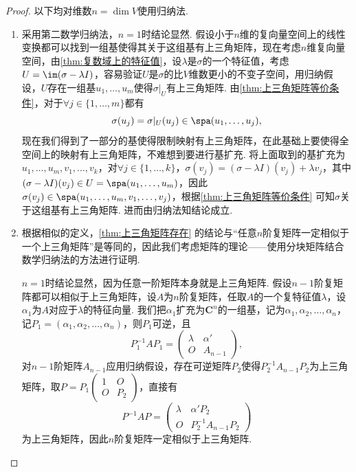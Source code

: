 \begin{proof}
    以下均对维数$n=\dim V$使用归纳法.
    \begin{enumerate}
        \item[法一:] 采用第二数学归纳法，$n=1$时结论显然. 假设小于$n$维的复向量空间上的线性变换都可以找到一组基使得其关于这组基有上三角矩阵，现在考虑$n$维复向量空间，由\autoref{thm:复数域上的特征值}，设$\lambda$是$\sigma$的一个特征值，考虑$U=\im(\sigma-\lambda I)$，容易验证$U$是$\sigma$的比$V$维数更小的不变子空间，用归纳假设，$U$存在一组基$u_1,\ldots,u_m$使得$\sigma\vert_U$有上三角矩阵. 由\autoref{thm:上三角矩阵等价条件}，对于$\forall j\in\{1,\ldots,m\}$都有
        \[\sigma(u_j)=\sigma\vert_U(u_j)\in\spa(u_1,\ldots,u_j),\]
        现在我们得到了一部分的基使得限制映射有上三角矩阵，在此基础上要使得全空间上的映射有上三角矩阵，不难想到要进行基扩充. 将上面取到的基扩充为$u_1,\ldots,u_m,v_1,\ldots,v_k$，对$\forall j\in\{1,\ldots,k\}$，$\sigma(v_j)=(\sigma-\lambda I)(v_j)+\lambda v_j$，其中$(\sigma-\lambda I)(v_j)\in U=\spa(u_1,\ldots,u_m)$，因此$\sigma(v_j)\in\spa(u_1,\ldots,u_m,v_1,\ldots,v_j)$，根据\autoref{thm:上三角矩阵等价条件} 可知$\sigma$关于这组基有上三角矩阵. 进而由归纳法知结论成立.

        \item[法二:] 根据相似的定义，\autoref{thm:上三角矩阵存在} 的结论与``任意$n$阶复矩阵一定相似于一个上三角矩阵''是等同的，因此我们考虑矩阵的理论——使用分块矩阵结合数学归纳法的方法进行证明.

        $n=1$时结论显然，因为任意一阶矩阵本身就是上三角矩阵. 假设$n-1$阶复矩阵都可以相似于上三角矩阵，设$A$为$n$阶复矩阵，任取$A$的一个复特征值$\lambda$，设$\alpha_1$为$A$对应于$\lambda$的特征向量. 我们把$\alpha_1$扩充为$\mathbf{C}^n$的一组基，记为$\alpha_1,\alpha_2,\ldots,\alpha_n$，记$P_1=(\alpha_1,\alpha_2,\ldots,\alpha_n)$，则$P_1$可逆，且\[P_1^{-1}AP_1=\begin{pmatrix}
            \lambda & \alpha' \\ O & A_{n-1}
        \end{pmatrix},\]
        对$n-1$阶矩阵$A_{n-1}$应用归纳假设，存在可逆矩阵$P_2$使得$P_2^{-1}A_{n-1}P_2$为上三角矩阵，取$P=P_1\begin{pmatrix}
            1 & O \\ O & P_2
        \end{pmatrix}$，直接有\[P^{-1}AP=\begin{pmatrix}
            \lambda & \alpha'P_2 \\ O & P_2^{-1}A_{n-1}P_2
        \end{pmatrix}\]
        为上三角矩阵，因此$n$阶复矩阵一定相似于上三角矩阵.


\end{enumerate}
\end{proof}
